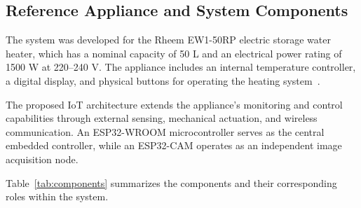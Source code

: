 \subsection{Reference Appliance and System Components}

The system was developed for the Rheem EW1-50RP electric storage water heater, which has a nominal capacity of 50 L
and an electrical power rating of 1500 W at 220--240 V. The appliance includes an internal temperature controller,
a digital display, and physical buttons for operating the heating system~\cite{rheemmanual}.

The proposed IoT architecture extends the appliance's monitoring and control capabilities through external sensing,
mechanical actuation, and wireless communication. An ESP32-WROOM microcontroller serves as the central embedded
controller, while an ESP32-CAM operates as an independent image acquisition node.

Table~\ref{tab:components} summarizes the components and their corresponding roles within the system.

